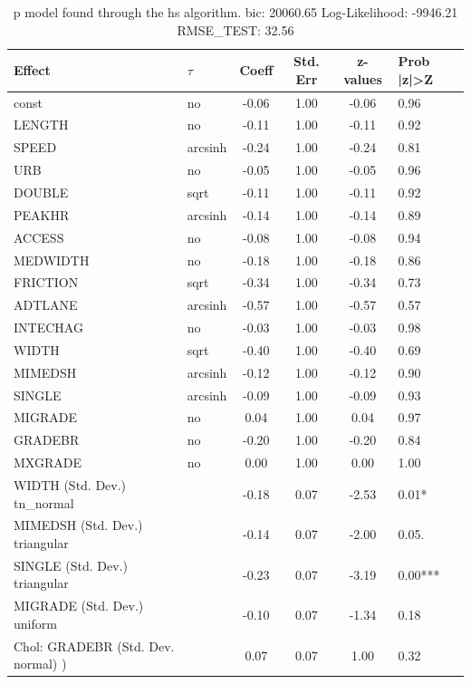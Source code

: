 \begin{table}
	\caption{p model found through the hs algorithm. bic: 20060.65 Log-Likelihood: -9946.21 RMSE_TEST: 32.56}
	\begin{center}
		\begin{tabular}{|l|l|c|c|c|l|}
			\hline
			Effect & $\tau$ & Coeff & Std. Err & z-values & Prob |z|>Z \\
			\hline
			const & no & -0.06 & 1.00 & -0.06 & 0.96 \\
			\hline
			LENGTH & no & -0.11 & 1.00 & -0.11 & 0.92 \\
			\hline
			SPEED & arcsinh & -0.24 & 1.00 & -0.24 & 0.81 \\
			\hline
			URB & no & -0.05 & 1.00 & -0.05 & 0.96 \\
			\hline
			DOUBLE & sqrt & -0.11 & 1.00 & -0.11 & 0.92 \\
			\hline
			PEAKHR & arcsinh & -0.14 & 1.00 & -0.14 & 0.89 \\
			\hline
			ACCESS & no & -0.08 & 1.00 & -0.08 & 0.94 \\
			\hline
			MEDWIDTH & no & -0.18 & 1.00 & -0.18 & 0.86 \\
			\hline
			FRICTION & sqrt & -0.34 & 1.00 & -0.34 & 0.73 \\
			\hline
			ADTLANE & arcsinh & -0.57 & 1.00 & -0.57 & 0.57 \\
			\hline
			INTECHAG & no & -0.03 & 1.00 & -0.03 & 0.98 \\
			\hline
			WIDTH & sqrt & -0.40 & 1.00 & -0.40 & 0.69 \\
			\hline
			MIMEDSH & arcsinh & -0.12 & 1.00 & -0.12 & 0.90 \\
			\hline
			SINGLE & arcsinh & -0.09 & 1.00 & -0.09 & 0.93 \\
			\hline
			MIGRADE & no & 0.04 & 1.00 & 0.04 & 0.97 \\
			\hline
			GRADEBR & no & -0.20 & 1.00 & -0.20 & 0.84 \\
			\hline
			MXGRADE & no & 0.00 & 1.00 & 0.00 & 1.00 \\
			\hline
			WIDTH (Std. Dev.) tn_normal &  & -0.18 & 0.07 & -2.53 & 0.01* \\
			\hline
			MIMEDSH (Std. Dev.) triangular &  & -0.14 & 0.07 & -2.00 & 0.05. \\
			\hline
			SINGLE (Std. Dev.) triangular &  & -0.23 & 0.07 & -3.19 & 0.00*** \\
			\hline
			MIGRADE (Std. Dev.) uniform &  & -0.10 & 0.07 & -1.34 & 0.18 \\
			\hline
			 Chol: GRADEBR (Std. Dev. normal) ) &  & 0.07 & 0.07 & 1.00 & 0.32 \\

\end{tabular}
\end{center}
\end{table}
